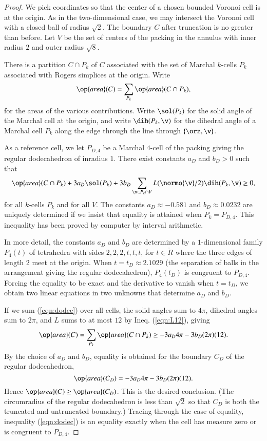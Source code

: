 \documentclass{llncs}
\def\area{\op{area}}
\begin{document}
\begin{proof}
  We pick coordinates so that the center of a chosen bounded Voronoi
  cell is at the origin.  As in the two-dimensional case, we may
  intersect the Voronoi cell with a closed ball of radius $\sqrt2$.
  The boundary $C$ after truncation is no greater than before.  Let
  $V$ be the set of centers of the packing in the annulus with inner
  radius $2$ and outer radius $\sqrt8$.

There is a partition $C\cap P_k$ of  $C$ associated with the set of
Marchal $k$-cells $P_k$ associated with  Rogers simplices at the origin. 
Write 
\[
\area(C) = \sum_{P_k} \area(C\cap P_k),
\]
for the areas of the various contributions.  Write $\sol(P_k)$ for the
solid angle of the Marchal cell at the origin, and write
$\dih(P_k,\v)$ for the dihedral angle of a Marchal cell $P_k$ along
the edge through the line through $\{\orz,\v\}$.

As a reference cell, we let $P_{D,4}$ be a Marchal $4$-cell of the
packing giving the regular dodecahedron of inradius $1$.  There exist
constants $a_D$ and $b_D>0$ such that
\begin{equation}\label{eqn:dodec}
\area(C\cap P_k) +  3 a_D \sol(P_k) + 
3 b_D \sum_{\v\in P_k\cap V} L(\normo{\v}/2)\dih(P_k,\v) \ge0,
\end{equation}
for all $k$-cells $P_k$ and for all $V$.  The constants $a_D\approx -0.581$ and
$b_D\approx 0.0232$ are uniquely determined if we insist that equality
is attained when $P_k = P_{D,4}$.  This inequality has been proved by
computer by interval arithmetic.  

In more detail, the constants $a_D$
and $b_D$ are determined by a $1$-dimensional family
$P_4(t)$ of tetrahedra with sides $2,2,2,t,t,t$, for $t\in \ring{R}$
where the three edges of length $2$ meet at the origin.  When
$t=t_D\approx 2.1029$ (the separation of balls in the arrangement
giving the regular dodecahedron), $P_4(t_D)$ is congruent to
$P_{D,4}$.  Forcing the equality to be exact and the derivative to
vanish when $t=t_D$, we obtain two linear equations in two unknowns
that determine $a_D$ and $b_D$.

If we sum (\ref{eqn:dodec}) over all cells, the solid angles sum to
$4\pi$, dihedral angles sum to $2\pi$, and $L$ sums to at most $12$ by
Ineq. (\ref{eqn:L12}), giving
\[
\area(C) = \sum_{P_k}\area(C\cap P_k) \ge -3 a_D 4\pi - 3 b_D (2\pi) (12).
\]
By the choice of $a_D$ and $b_D$, equality is obtained for the boundary
$C_D$ of the regular dodecahedron, 
\[
\area(C_D) = -3 a_D 4\pi - 3 b_D (2\pi) (12).
\]
Hence $\area(C)\ge \area(C_D)$. This is the desired conclusion.  (The
circumradius of the regular dodecahedron is less than $\sqrt2$ so that
$C_D$ is both the truncated and untruncated boundary.)  Tracing
through the case of equality, inequality (\ref{eqn:dodec}) is an
equality exactly when the cell has measure zero or is congruent to
$P_{D,4}$.
\end{proof}
\end{document}
